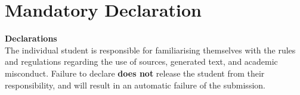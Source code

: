 \newpage
\singlespacing 
\section*{Mandatory Declaration}
{\bf{Declarations}} \\
The individual student is responsible for familiarising themselves with the rules and regulations regarding the use of sources, generated text, and academic misconduct. Failure to declare \textbf{does not} release the student from their responsibility, and will result in an automatic failure of the submission.\newline
